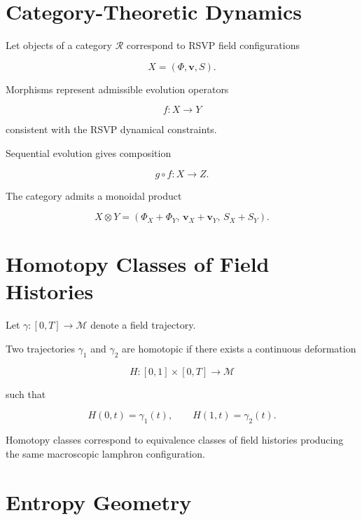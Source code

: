 \documentclass[12pt]{article}
\begin{document}
\section{Category-Theoretic Dynamics}

Let objects of a category $\mathcal{R}$ correspond to RSVP field configurations

\begin{equation}
X = (\Phi,\mathbf{v},S).
\end{equation}

Morphisms represent admissible evolution operators

\begin{equation}
f : X \rightarrow Y
\end{equation}

consistent with the RSVP dynamical constraints.

Sequential evolution gives composition

\begin{equation}
g \circ f : X \rightarrow Z .
\end{equation}

The category admits a monoidal product

\begin{equation}
X \otimes Y
=
(\Phi_X+\Phi_Y,\,
\mathbf{v}_X+\mathbf{v}_Y,\,
S_X+S_Y).
\end{equation}

\section{Homotopy Classes of Field Histories}

Let $\gamma : [0,T] \rightarrow \mathcal{M}$ denote a field trajectory.

Two trajectories $\gamma_1$ and $\gamma_2$ are homotopic if there exists a continuous deformation

\begin{equation}
H : [0,1] \times [0,T] \rightarrow \mathcal{M}
\end{equation}

such that

\begin{equation}
H(0,t)=\gamma_1(t),
\qquad
H(1,t)=\gamma_2(t).
\end{equation}

Homotopy classes correspond to equivalence classes of field histories producing the same macroscopic lamphron configuration.

\section{Entropy Geometry}
\end{document}
